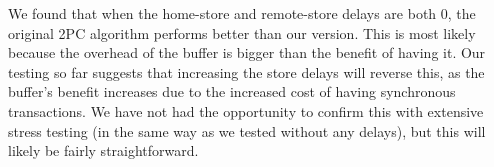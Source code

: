 \documentclass{article}
\begin{document}
We found that when the home-store and remote-store delays are both 0, the
original 2PC algorithm performs better than our version. This is most likely
because the overhead of the buffer is bigger than the benefit of having it. Our
testing so far suggests that increasing the store delays will reverse this, as
the buffer's benefit increases due to the increased cost of having synchronous
transactions. We have not had the opportunity to confirm this with extensive
stress testing (in the same way as we tested without any delays), but this will
likely be fairly straightforward.
\end{document}
